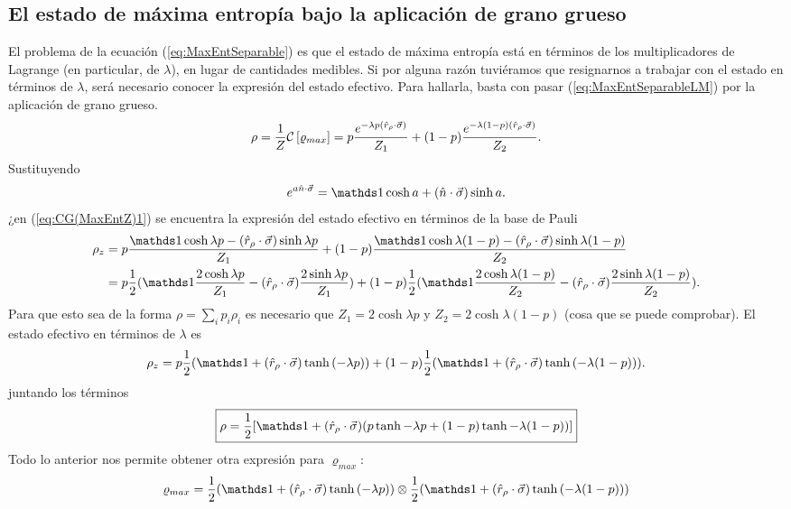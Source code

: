 \subsection{El estado de máxima entropía bajo la aplicación de grano grueso}\label{sec:CG(MaxEnt)}
El problema de la ecuación (\ref{eq:MaxEntSeparable}) es que el estado de máxima entropía está en términos de los multiplicadores de Lagrange (en particular, de $\lambda$), en lugar de cantidades medibles. Si por alguna razón tuviéramos que resignarnos a trabajar con el estado en términos de $\lambda$, será necesario conocer la expresión del estado efectivo. Para hallarla, basta con pasar (\ref{eq:MaxEntSeparableLM}) por la aplicación de grano grueso.
\begin{equation}\label{eq:CG(MaxEntZ)1}
    \rho=\frac{1}{Z}\mathcal{C}\left[\varrho_{max}\right]=p\frac{e^{-\lambda p(\hat{r}_{\rho}\cdot\vec{\sigma})}}{Z_{1}}+(1-p)\frac{e^{-\lambda (1-p)(\hat{r}_{\rho}\cdot\vec{\sigma})}}{Z_{2}}.
\end{equation}
Sustituyendo
\begin{equation}\label{eq:PauliVectorExp}
    e^{a\hat{n}\cdot \vec{\sigma}}=\Id \cosh{a}+(\hat{n}\cdot \vec{\sigma})\sinh{a}.
\end{equation}
¿en (\ref{eq:CG(MaxEntZ)1}) se encuentra la expresión del estado efectivo en términos de la base de Pauli
\begin{align*}
    \rho_{z}&=p\frac{\Id \cosh{\lambda p}-(\hat{r}_{\rho}\cdot\vec{\sigma})\sinh{\lambda p}}{Z_{1}}+(1-p)\frac{\Id \cosh{\lambda (1-p)}-(\hat{r}_{\rho}\cdot\vec{\sigma})\sinh{\lambda (1-p)}}{Z_{2}}\\
    &=p\frac{1}{2}(\Id \frac{2\cosh{\lambda p}}{Z_{1}}-(\hat{r}_{\rho}\cdot\vec{\sigma})\frac{2\sinh{\lambda p}}{Z_{1}})+(1-p)\frac{1}{2}(\Id \frac{2\cosh{\lambda (1-p)}}{Z_{2}}-(\hat{r}_{\rho}\cdot\vec{\sigma})\frac{2\sinh{\lambda (1-p)}}{Z_{2}}).
\end{align*}
Para que esto sea de la forma $\rho=\sum_{i}p_{i}\rho_{i}$ es necesario que $Z_{1}=2\cosh{\lambda p}$ y $Z_{2}=2\cosh{\lambda (1-p)}$ (cosa que se puede comprobar). El estado efectivo en términos de $\lambda $ es
\begin{equation}\label{eq:CG(MaxEntZ)2}
    \rho_{z}=p\frac{1}{2}(\Id+(\hat{r}_{\rho}\cdot\vec{\sigma})\tanh{(-\lambda p)})+(1-p)\frac{1}{2}(\Id+(\hat{r}_{\rho}\cdot\vec{\sigma})\tanh{(-\lambda (1-p))}).
\end{equation}
juntando los términos
\begin{equation}\label{eq:CG(MaxEnt)}
  \boxed{\rho=\frac{1}{2}[\Id+(\hat{r}_{\rho}\cdot\vec{\sigma})(p\tanh{-\lambda p}+(1-p)\tanh{-\lambda (1-p)})]}
\end{equation}
Todo lo anterior nos permite obtener otra expresión para $\varrho_{max}$:
\begin{equation*}
  \varrho_{max}=\frac{1}{2}(\Id+(\hat{r}_{\rho}\cdot\vec{\sigma})\tanh{(-\lambda p)})\otimes\frac{1}{2}(\Id+(\hat{r}_{\rho}\cdot\vec{\sigma})\tanh{(-\lambda (1-p))})
\end{equation*}
